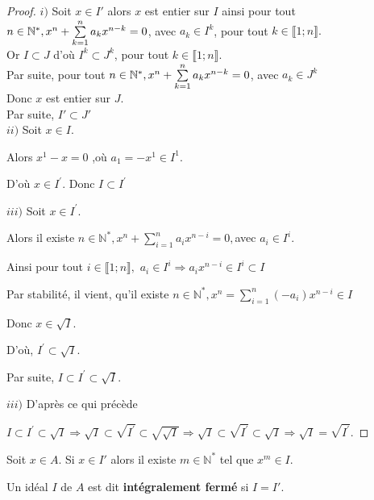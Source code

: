 \begin{proof}
	$i)$ Soit $x \in I'$ alors $x$ est entier sur $I$ ainsi pour tout $n \in \mathbb{N}^*,\\ x^n + \sum\limits_{k=1}^{n} a_k x^{n-k}=0$, avec $a_k \in I^k$, pour tout $k \in \llbracket 1; n \rrbracket.$\\ 
	Or $I \subset J$ d'où $I^k \subset J^k$, pour tout $k \in \llbracket 1; n \rrbracket$.\\
	Par suite, pour tout $n \in \mathbb{N}^*,\\ x^n + \sum\limits_{k=1}^{n} a_k x^{n-k}=0$, avec $a_k \in J^k$\\
	Donc $x$ est entier sur $J$.\\ Par suite, $I' \subset J'$	\\
	$ii)$ Soit $x\in I.$
	
	Alors $x^{1}-x=0$ ,où $a_{1}=-x^{1}\in I^{1}.$
	
	D'où $x\in I^{\prime }.$ Donc $I\subset I^{\prime }$
	
	$iii)$ Soit $x\in I^{\prime }.$
	
	Alors il existe $n\in \mathbb{N}^{\ast },x^{n}+\sum\limits_{i=1}^{n}a_{i}x^{n-i}=0,$avec $a_{i}\in I^{i}.$
	
	Ainsi pour tout $i\in \llbracket 1; n \rrbracket,$ $a_{i}\in I^{i}\Rightarrow
	a_{i}x^{n-i}\in I^{i}\subset I$
	
	Par stabilité, il vient, qu'il existe $n\in \mathbb{N}^{\ast },x^{n}=\sum\limits_{i=1}^{n}(-a_{i})x^{n-i}\in I$
	
	Donc $x\in \sqrt{I}.$
	
	D'où, $I^{\prime }\subset \sqrt{I}.$
	
	Par suite, $I\subset I^{\prime }\subset \sqrt{I}.$
	
	$iii)$ D'après ce qui précède
	
	$I\subset I^{\prime }\subset \sqrt{I}\Rightarrow \sqrt{I}\subset \sqrt{I^{\prime }}\subset \sqrt{\sqrt{I}}\Rightarrow \sqrt{I}\subset \sqrt{I^{\prime }}\subset \sqrt{I}\Rightarrow \sqrt{I}=\sqrt{I^{\prime }}.$
\end{proof}
\begin{maconsequence}
	Soit $x \in A$.
	Si $x \in I'$ alors il existe $m \in \mathbb{N^*}$ tel que $x^m \in I$.
\end{maconsequence}
\begin{madefinition}
	Un idéal $I$ de $A$ est dit \textbf{intégralement fermé} si $I = I'$.
\end{madefinition}

